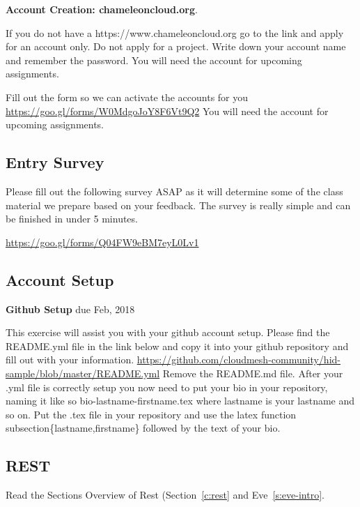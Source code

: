 \begin{exercise}
  {\bf Account Creation: chameleoncloud.org}. 
  
  If you do not have a
  https://www.chameleoncloud.org go to the link and apply for an
  account only. Do not apply for a project. Write down your account
  name and remember the password. You will need the account for
  upcoming assignments.
\end{exercise}

\begin{exercise}
Fill out the form so we can activate the accounts for you
\url{https://goo.gl/forms/W0MdgoJoY8F6Vt9Q2}
You will need the account for
  upcoming assignments.
\end{exercise}

\subsection{Entry Survey}
\begin{exercise}
Please fill out the following survey ASAP as it will determine some of the class material we prepare based on your feedback. The survey is really simple and can be finished in under 5 minutes.

\url{https://goo.gl/forms/Q04FW9eBM7eyL0Lv1}
\end{exercise}

\subsection{Account Setup}

\begin{exercise} {\bf Github Setup} due Feb, 2018

This exercise will assist you with your github account setup. Please find the README.yml file in the link below and copy it into your github repository and fill out with your information. \url{https://github.com/cloudmesh-community/hid-sample/blob/master/README.yml} Remove the README.md file. After your .yml file is correctly setup you now need to put your bio in your repository, naming it like so bio-lastname-firstname.tex where lastname is your lastname and so on. Put the .tex file in your repository and use the latex function subsection\{lastname,firstname\} followed by the text of your bio.

\end{exercise}

\subsection{REST}
\begin{exercise}
Read the Sections Overview of Rest (Section~\ref{c:rest} and Eve~\ref{s:eve-intro}.
\end{exercise}

